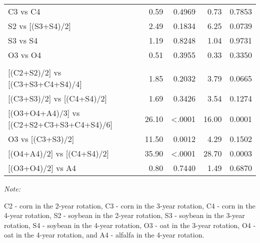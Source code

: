 \documentclass[
]{article}
\begin{document}
\begin{table}[H]
\begin{threeparttable}
\begin{tabular}[t]{lrrrrrr}
\hspace{1em}\hspace{1em}C3 vs C4 &  &  & 0.59 & 0.4969 & 0.73 & 0.7853\\
 
\hspace{1em}\hspace{1em}S2 vs [(S3+S4)/2] &  &  & 2.49 & 0.1834 & 6.25 & 0.0739\\
 
\hspace{1em}\hspace{1em}S3 vs S4 &  &  & 1.19 & 0.8248 & 1.04 & 0.9731\\
 
\hspace{1em}\hspace{1em}O3 vs O4 &  &  & 0.51 & 0.3955 & 0.33 & 0.3350\\
 
\addlinespace[0.3em]
\multicolumn{7}{l}{\textbf{(B3) - Crop type effects}}\\
\hspace{1em}\hspace{1em}{}[(C2+S2)/2] vs [(C3+S3+C4+S4)/4] &  &  & 1.85 & 0.2032 & 3.79 & 0.0665\\
 
\hspace{1em}\hspace{1em}{}[(C3+S3)/2] vs [(C4+S4)/2] &  &  & 1.69 & 0.3426 & 3.54 & 0.1274\\
 
\hspace{1em}\hspace{1em}{}[(O3+O4+A4)/3] vs [(C2+S2+C3+S3+C4+S4)/6] &  &  & 26.10 & <.0001 & 16.00 & 0.0001\\
 
\hspace{1em}\hspace{1em}O3 vs [(C3+S3)/2] &  &  & 11.50 & 0.0012 & 4.29 & 0.1502\\
 
\hspace{1em}\hspace{1em}{}[(O4+A4)/2] vs [(C4+S4)/2] &  &  & 35.90 & <.0001 & 28.70 & 0.0003\\
 
\hspace{1em}\hspace{1em}{}[(O3+O4)/2] vs A4 &  &  & 0.80 & 0.7440 & 1.49 & 0.6870\\
\bottomrule
\end{tabular}
\begin{tablenotes}[para]
\item \textit{Note: } 
\item C2 - corn in the 2-year rotation, C3 - corn in the 3-year rotation, C4 - corn in the 4-year rotation, S2 - soybean in the 2-year rotation, S3 - soybean in the 3-year rotation, S4 - soybean in the 4-year rotation, O3 - oat in the 3-year rotation, O4 - oat in the 4-year rotation, and A4 - alfalfa in the 4-year rotation.
\end{tablenotes}
\end{threeparttable}
\end{table}
\end{document}
